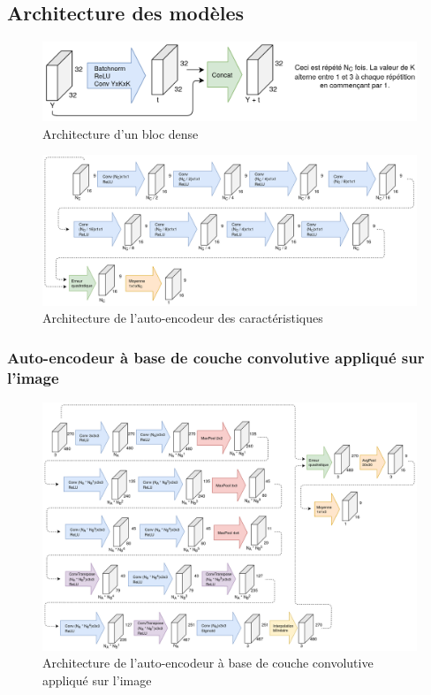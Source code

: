\subsection{Architecture des modèles}

    \begin{figure}[H]
        \centering
        \includegraphics[width=12cm]{images/Architecture_DenseBlock.png}
        \caption{Architecture d'un bloc dense}
        \label{fig:architecture_bloc_dense}
    \end{figure}

    \begin{figure}[H]
        \centering
        \includegraphics[width=17cm]{images/Architecture_FeatureAutoencoder.png}
        \caption{Architecture de l'auto-encodeur des caractéristiques}
        \label{fig:architecture_autoencoder_caracteristique}
    \end{figure}

\subsubsection{Auto-encodeur à base de couche convolutive appliqué sur l'image}
    \begin{figure}[H]
        \centering
        \includegraphics[width=17cm]{images/Architecture_CnnAutoencoder.png}
        \caption{Architecture de l'auto-encodeur à base de couche convolutive appliqué sur l'image}
        \label{fig:architecture_cnn_autoencoder}
    \end{figure}

